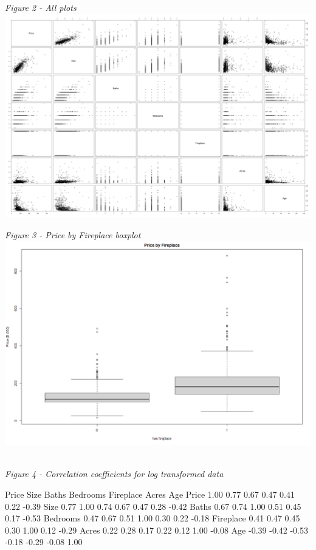 \documentclass[10pt,A4,makeidx]{article}
\begin{document}
  \emph{Figure 2 - All plots}\\
  \includegraphics[scale=2]{plot.png}
  
  \emph{Figure 3 - Price by Fireplace boxplot}\\
  \includegraphics[scale=0.4]{price-fireplace.png}
  
  \emph{\\Figure 4 - Correlation coefficients for log transformed data}
  \begin{Soutput}
              Price  Size Baths Bedrooms Fireplace Acres   Age
    Price      1.00  0.77  0.67     0.47      0.41  0.22 -0.39
    Size       0.77  1.00  0.74     0.67      0.47  0.28 -0.42
    Baths      0.67  0.74  1.00     0.51      0.45  0.17 -0.53
    Bedrooms   0.47  0.67  0.51     1.00      0.30  0.22 -0.18
    Fireplace  0.41  0.47  0.45     0.30      1.00  0.12 -0.29
    Acres      0.22  0.28  0.17     0.22      0.12  1.00 -0.08
    Age       -0.39 -0.42 -0.53    -0.18     -0.29 -0.08  1.00
  \end{Soutput}
\end{document}
